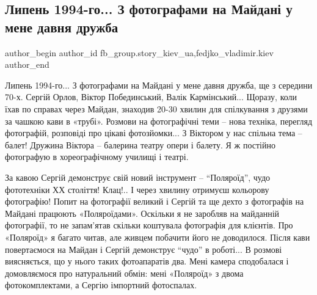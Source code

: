  
 
 
 
 
 
\subsection{Липень 1994-го... З фотографами на Майдані у мене давня дружба}
\label{sec:05_12_2021.fb.fb_group.story_kiev_ua.2.1994_maidan_foto}
 
\ifcmt
 author_begin
   author_id fb_group.story_kiev_ua,fedjko_vladimir.kiev
 author_end
\fi

\begin{multicols}{2} %

Липень 1994-го... З фотографами на Майдані у мене давня дружба, ще з середини
70-х. Сергій Орлов, Віктор Побединський, Валік Кармінський... Щоразу, коли їхав
по справах через Майдан, знаходив 20-30 хвилин для спілкування з друзями за
чашкою кави в «трубі». Розмови на фотографічні теми – нова техніка, перегляд
фотографій, розповіді про цікаві фотозйомки... З Віктором у нас спільна тема –
балет! Дружина Віктора – балерина театру опери і балету. Я ж постійно
фотографую в хореографічному училищі і театрі. 

\vspace{3.5cm}
\medskip

\setlength{\parindent}{0pt}


\end{multicols} %

За кавою Сергій демонструє свій новий інструмент – \enquote{Поляроїд}, чудо фототехніки
ХХ століття! Клац!.. І через хвилину отримуєш кольорову фотографію! Попит на
фотографії великий і Сергій та ще дехто з фотографів на Майдані працюють
«Поляроїдами». Оскільки я не заробляв на майданній фотографії, то не запам’ятав
скільки коштувала фотографія для клієнтів. Про «Поляроїд» я багато читав, але
живцем побачити його не доводилося.  Після кави повертаємося на Майдан і Сергій
демонструє \enquote{чудо} в роботі... В розмові виясняється, що у нього таких
фотоапаратів два. Мені камера сподобалася і домовляємося про натуральний обмін:
мені «Поляроїд» з двома фотокомплектами, а Сергію імпортний фотоспалах.

